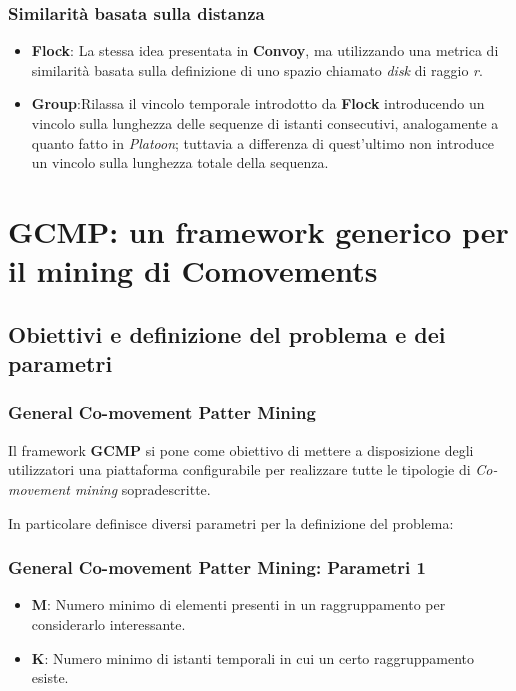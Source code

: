 \documentclass{beamer}
\begin{document}
\begin{frame}

\frametitle{Similarità basata sulla distanza}

\begin{itemize}

\item \textbf{Flock}: La stessa idea presentata in \textbf{Convoy}, ma utilizzando una metrica di similarità basata sulla definizione
di uno spazio chiamato \textit{disk} di raggio \textit{r}.


\item \textbf{Group}:Rilassa il vincolo temporale introdotto da \textbf{Flock} introducendo un vincolo sulla lunghezza delle sequenze di istanti consecutivi, analogamente a quanto fatto in \textit{Platoon}; tuttavia a differenza di quest'ultimo non introduce un vincolo sulla lunghezza totale della sequenza.


\end{itemize}

\end{frame}




\section{GCMP: un framework generico per il mining di Comovements}

\subsection{Obiettivi e definizione del problema e dei parametri}

\begin{frame}
\frametitle{General Co-movement Patter Mining}
Il framework \textbf{GCMP} si pone come obiettivo di mettere a disposizione degli utilizzatori una piattaforma configurabile per realizzare tutte le tipologie di \textit{Co-movement mining} sopradescritte.

In particolare definisce diversi parametri per la definizione del problema:
\end{frame}

\begin{frame}
\frametitle{General Co-movement Patter Mining: Parametri 1}

\begin{itemize}

\item \textbf{M}: Numero minimo di elementi presenti in un raggruppamento per considerarlo interessante.
\item \textbf{K}: Numero minimo di istanti temporali in cui un certo raggruppamento esiste.

\end{itemize}

\end{frame}
\end{document}
